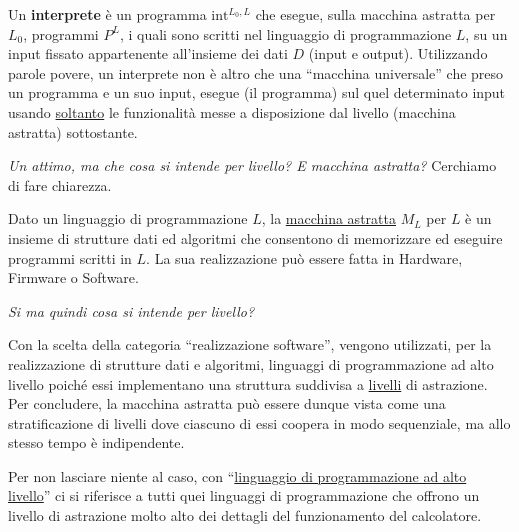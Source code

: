 \documentclass[a4paper]{article}
\newcommand{\dquotes}[1]{``#1''}
\begin{document}
	Un \textbf{interprete} è un programma $\mathrm{int}^{L_{0}, L}$ che esegue, sulla macchina astratta per $L_{0}$, programmi $P^{L}$, i quali sono scritti nel linguaggio di programmazione $L$, su un input fissato appartenente all'insieme dei dati $D$ (input e output).\newline
	Utilizzando parole povere, un interprete non è altro che una \dquotes{macchina universale} che preso un programma e un suo input, esegue (il programma) sul quel determinato input usando \underline{soltanto} le funzionalità messe a disposizione dal livello (macchina astratta) sottostante.
	\begin{mdframed}
		\emph{Un attimo, ma che cosa si intende per livello? E macchina astratta?} Cerchiamo di fare chiarezza.\newline
		
		\noindent
		Dato un linguaggio di programmazione $L$, la \underline{macchina astratta} $M_{L}$ per $L$ è un insieme di strutture dati ed algoritmi che consentono di memorizzare ed eseguire programmi scritti in $L$. La sua realizzazione può essere fatta in Hardware, Firmware o Software.\newline
		
		\noindent
		\emph{Si ma quindi cosa si intende per livello?}\newline
		
		\noindent
		Con la scelta della categoria \dquotes{realizzazione software}, vengono utilizzati, per la realizzazione di strutture dati e algoritmi, linguaggi di programmazione ad alto livello poiché essi implementano una struttura suddivisa a \underline{livelli} di astrazione.\newline
		Per concludere, la macchina astratta può essere dunque vista come una stratificazione di livelli dove ciascuno di essi coopera in modo sequenziale, ma allo stesso tempo è indipendente.\newline
		
		\noindent
		Per non lasciare niente al caso, con \dquotes{\underline{linguaggio di programmazione ad alto} \underline{livello}} ci si riferisce a tutti quei linguaggi di programmazione che offrono un livello di astrazione molto alto dei dettagli del funzionamento del calcolatore.
	\end{mdframed}\newpage
	
\end{document}
